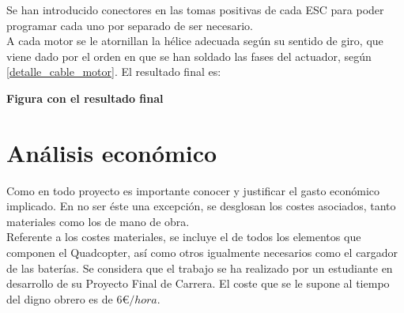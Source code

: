 \documentclass[twoside,11pt]{book}
\begin{document}
Se han introducido conectores en las tomas positivas de cada ESC para poder programar cada uno por separado de ser necesario. \\

A cada motor se le atornillan la hélice adecuada según su sentido de giro, que viene dado por el orden en que se han soldado las fases del actuador, según \ref{detalle_cable_motor}. El resultado final es:

\textbf{Figura con el resultado final}

\newpage

\chapter{Análisis económico} \label{economics}

Como en todo proyecto es importante conocer y justificar el gasto económico implicado. En no ser éste una excepción, se desglosan los costes asociados, tanto materiales como los de mano de obra. \\
Referente a los costes materiales, se incluye el de todos los elementos que componen el Quadcopter, así como otros igualmente necesarios como el cargador de las baterías. Se considera que el trabajo se ha realizado por un estudiante en desarrollo de su Proyecto Final de Carrera. El coste que se le supone al tiempo del digno obrero es de $6$€$/ hora$. \\  
\end{document}
